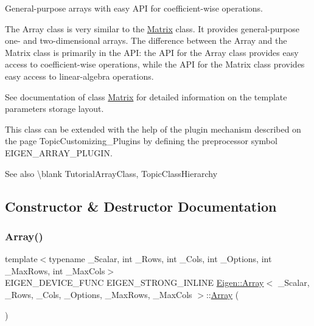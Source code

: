 General-\/purpose arrays with easy A\+PI for coefficient-\/wise operations. 

The Array class is very similar to the \mbox{\hyperlink{class_eigen_1_1_matrix}{Matrix}} class. It provides general-\/purpose one-\/ and two-\/dimensional arrays. The difference between the Array and the Matrix class is primarily in the A\+PI\+: the A\+PI for the Array class provides easy access to coefficient-\/wise operations, while the A\+PI for the Matrix class provides easy access to linear-\/algebra operations.

See documentation of class \mbox{\hyperlink{class_eigen_1_1_matrix}{Matrix}} for detailed information on the template parameters storage layout.

This class can be extended with the help of the plugin mechanism described on the page Topic\+Customizing\+\_\+\+Plugins by defining the preprocessor symbol {\ttfamily E\+I\+G\+E\+N\+\_\+\+A\+R\+R\+A\+Y\+\_\+\+P\+L\+U\+G\+IN}.

\begin{DoxySeeAlso}{See also}
\textbackslash{}blank Tutorial\+Array\+Class, Topic\+Class\+Hierarchy 
\end{DoxySeeAlso}


\subsection{Constructor \& Destructor Documentation}
\mbox{\label{class_eigen_1_1_array_a715524a79accfdc70dbc8cab1d7086ae}} 
\subsubsection{\texorpdfstring{Array()}{Array()}\hspace{0.1cm}{\footnotesize\ttfamily [1/5]}}
{\footnotesize\ttfamily template$<$typename \+\_\+\+Scalar, int \+\_\+\+Rows, int \+\_\+\+Cols, int \+\_\+\+Options, int \+\_\+\+Max\+Rows, int \+\_\+\+Max\+Cols$>$ \\
E\+I\+G\+E\+N\+\_\+\+D\+E\+V\+I\+C\+E\+\_\+\+F\+U\+NC E\+I\+G\+E\+N\+\_\+\+S\+T\+R\+O\+N\+G\+\_\+\+I\+N\+L\+I\+NE \mbox{\hyperlink{class_eigen_1_1_array}{Eigen\+::\+Array}}$<$ \+\_\+\+Scalar, \+\_\+\+Rows, \+\_\+\+Cols, \+\_\+\+Options, \+\_\+\+Max\+Rows, \+\_\+\+Max\+Cols $>$\+::\mbox{\hyperlink{class_eigen_1_1_array}{Array}} (\begin{DoxyParamCaption}{ }\end{DoxyParamCaption})\hspace{0.3cm}{\ttfamily [inline]}}

